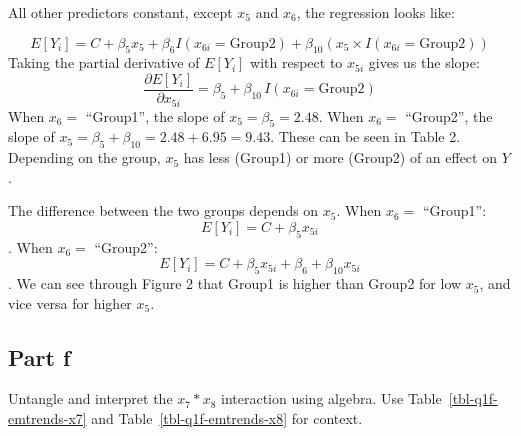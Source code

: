\documentclass[
]{article}
\newenvironment{Shaded}{\begin{snugshade}}{\end{snugshade}}
\newcommand{\AttributeTok}[1]{\textcolor[rgb]{0.40,0.45,0.13}{#1}}
\newcommand{\DecValTok}[1]{\textcolor[rgb]{0.68,0.00,0.00}{#1}}
\newcommand{\FunctionTok}[1]{\textcolor[rgb]{0.28,0.35,0.67}{#1}}
\newcommand{\NormalTok}[1]{\textcolor[rgb]{0.00,0.23,0.31}{#1}}
\newcommand{\OtherTok}[1]{\textcolor[rgb]{0.00,0.23,0.31}{#1}}
\newcommand{\SpecialCharTok}[1]{\textcolor[rgb]{0.37,0.37,0.37}{#1}}
\newcommand{\StringTok}[1]{\textcolor[rgb]{0.13,0.47,0.30}{#1}}
\begin{document}
\normalsize

All other predictors constant, except \(x_5\) and \(x_6\), the
regression looks like:

\[ E[Y_i] = C + \beta_5 x_5 + \beta_6 I(x_{6i}=\text{Group2}) + \beta_{10} (x_5 \times I(x_{6i}=\text{Group2})) \]
Taking the partial derivative of \(E[Y_i]\) with respect to \(x_{5i}\)
gives us the slope:
\[\frac{\partial E[Y_i]}{\partial x_{5i}} = \beta_5 + \beta_{10}\, I(x_{6i}=\text{Group2})\]
When \(x_6 =\) ``Group1'', the slope of \(x_5 = \beta_5 = 2.48\). When
\(x_6 =\) ``Group2'', the slope of
\(x_5 = \beta_5 + \beta_{10} = 2.48 + 6.95 = 9.43\). These can be seen
in Table 2. Depending on the group, \(x_5\) has less (Group1) or more
(Group2) of an effect on \(Y\).

The difference between the two groups depends on \(x_5\). When \(x_6 =\)
``Group1'': \[E[Y_i] = C +\beta_5 x_{5i}\]. When \(x_6 =\) ``Group2'':
\[E[Y_i] = C + \beta_5 x_{5i} + \beta_6 + \beta_{10} x_{5i}\]. We can
see through Figure 2 that Group1 is higher than Group2 for low \(x_5\),
and vice versa for higher \(x_5\).

\subsection{Part f}\label{part-f}

Untangle and interpret the \(x_7*x_8\) interaction using algebra. Use
Table~\ref{tbl-q1f-emtrends-x7} and Table~\ref{tbl-q1f-emtrends-x8} for
context.

\scriptsize

\begin{Shaded}
\end{Shaded}
\end{document}
